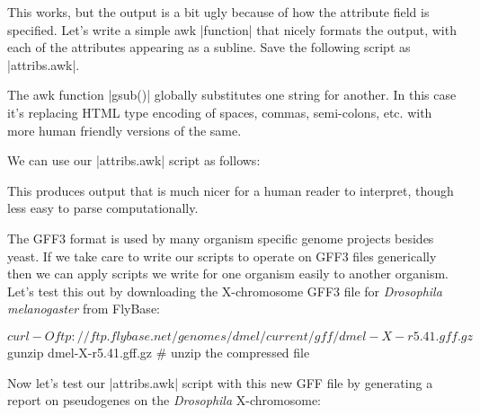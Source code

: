 This works, but the output is a bit ugly because of how the attribute field is specified. Let's write a simple awk |function| that nicely formats the output, with each of the attributes appearing as a subline. Save the following script as |attribs.awk|.


The awk function |gsub()| globally substitutes one string for another. In this case it's replacing HTML type encoding of spaces, commas, semi-colons, etc. with more human friendly versions of the same.

We can use our |attribs.awk| script as follows:

This produces output that is much nicer for a human reader to interpret, though less easy to parse computationally.

The GFF3 format is used by many organism specific genome projects besides yeast. If we take care to write our scripts to operate on GFF3 files generically then we can apply scripts we write for one organism easily to another organism. Let's test this out by downloading the X-chromosome GFF3 file for \textit{Drosophila melanogaster} from FlyBase:

\begin{bash}
$ curl -O ftp://ftp.flybase.net/genomes/dmel/current/gff/dmel-X-r5.41.gff.gz   
$ gunzip dmel-X-r5.41.gff.gz  # unzip the compressed file
\end{bash}

Now let's test our |attribs.awk| script with this new GFF file by generating a report on pseudogenes on the \textit{Drosophila} X-chromosome:

